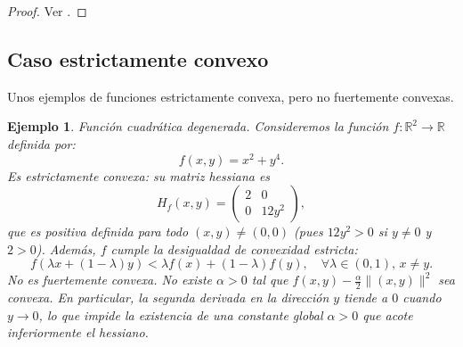 \documentclass[12pt]{book}
\newtheorem{ex}{Ejemplo}
\theoremstyle{definition}
\theoremstyle{plain}
\theoremstyle{remark}
\begin{document}
\begin{proof}
Ver \cite{allaire2007}. %

\end{proof}

%
%




\subsection{Caso estrictamente convexo}

Unos ejemplos de funciones estrictamente convexa, pero no fuertemente convexas.


\begin{ex}
Función cuadrática degenerada.
   Consideremos la función \(f: \mathbb{R}^2 \to \mathbb{R}\) definida por:
   \[
   f(x, y) = x^2 + y^4.
   \]
Es estrictamente convexa: su matriz hessiana es
     \[
     H_f(x, y) = \begin{pmatrix} 2 & 0 \\ 0 & 12y^2 \end{pmatrix},
     \]
     que es positiva definida para todo \((x, y) \neq (0, 0)\) (pues \(12y^2 > 0\) si \(y \neq 0\) y \(2 > 0\)).
     Además, \(f\) cumple la desigualdad de convexidad estricta:
     \[
     f(\lambda x + (1-\lambda) y) < \lambda f(x) + (1-\lambda) f(y), \quad \forall \lambda \in (0, 1), \, x \neq y.
     \]
No es fuertemente convexa. No existe \(\alpha > 0\) tal que \(f(x, y) - \frac{\alpha}{2} \| (x, y) \|^2\) sea convexa. En particular, la segunda derivada en la dirección \(y\) tiende a \(0\) cuando \(y \to 0\), lo que impide la existencia de una constante global \(\alpha > 0\) que acote inferiormente el hessiano.
\end{ex}
\end{document}
